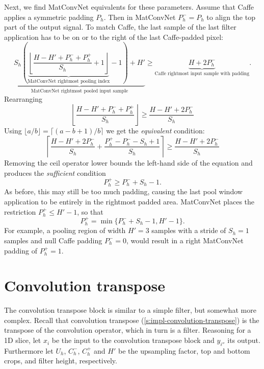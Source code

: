 Next, we find MatConvNet equivalents for these parameters. Assume that Caffe applies a symmetric padding $P_h$. Then in MatConvNet $P_h^-=P_h$ to align the top part of the output signal. To match Caffe, the last sample of the last filter application has to be on or to the right of the last Caffe-padded pixel:
\[
\underbrace{
S_h
\left(
\underbrace
{
\left\lfloor
\frac{H - H' + P_h^- + P_h^+}{S_h}  + 1 
\right\rfloor
}_{\text{MatConvNet rightmost pooling index}}
- 1
\right)
+ H'
}_{\text{MatConvNet rightmost pooled input sample}}
\geq
\underbrace{
H + 2P_h^-
}_{\text{Caffe rightmost input sample with padding}}.
\]
Rearranging
\[
\left\lfloor
\frac{H - H' + P_h^- + P_h^+}{S_h}
\right\rfloor
\geq
\frac{H - H' + 2P_h^{-}}{S_h}
\]
Using $\lfloor a/b \rfloor = \lceil (a - b + 1)/b\rceil$ we get the \emph{equivalent} condition:
\[
\left\lceil 
\frac{H - H' + 2P_h^-}{S_h} + \frac{P_h^+ - P_h^- - S_h + 1}{S_h}
\right\rceil
\geq
\frac{H - H' + 2P_h^-}{S_h} 
\]
Removing the ceil operator lower bounds the left-hand side of the equation and produces the \emph{sufficient} condition
\[
 P_h^+ \geq P_h^- + S_h - 1.
\]
As before, this may still be too much padding, causing the last pool window application to be entirely in the rightmost padded area. MatConvNet places the restriction $P_h^+ \leq H' -1$, so that
\[
  P_h^+ = \min\{ P_h^- + S_h - 1 , H' - 1\}.
\]
For example, a pooling region of width $H'=3$ samples with  a stride of $S_h=1$ samples and null Caffe padding $P_h^-=0$, would result in a right MatConvNet padding of $P_h^+ = 1$.

\section{Convolution transpose}\label{s:receptive-convolution-transpose}

The convolution transpose block is similar to a simple filter, but somewhat more complex. Recall that convolution transpose (\cref{s:impl-convolution-transpose}) is the transpose of the convolution operator, which in turn is a filter. Reasoning for a 1D slice, let $x_i$ be the input to the convolution transpose block and $y_{i''}$ its output. Furthermore let $U_h$, $C_h^-$, $C_h^+$ and $H'$ be the upsampling factor, top and bottom crops, and filter height, respectively.

